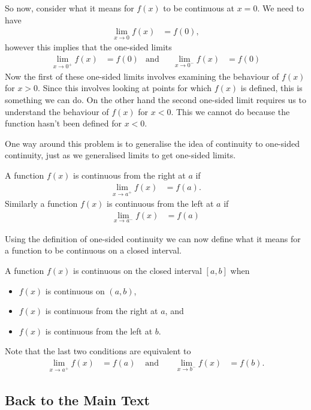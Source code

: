 So now, consider what it means for $f(x)$ to be continuous at $x=0$. We need to have
\begin{align*}
  \lim_{x\to 0} f(x) &= f(0),
\end{align*}
however this implies that the one-sided limits
\begin{align*}
  \lim_{x\to 0^+} f(x) &= f(0) & \text{and}&& \lim_{x\to 0^-} f(x) &= f(0)
\end{align*}
Now the first of these one-sided limits involves examining the behaviour of $f(x)$ for
$x>0$. Since this involves looking at points for which $f(x)$ is defined, this is
something we can do. On the other hand the second one-sided limit requires us to
understand the behaviour of $f(x)$ for $x<0$. This we cannot do because the function
hasn't been defined for $x<0$.

One way around this problem is to generalise the idea of continuity to one-sided
continuity, just as we generalised limits to get one-sided limits.
\begin{defn}\label{def_1_6_2}
  A function $f(x)$ is continuous from the right at $a$ if
  \begin{align*}
    \lim_{x\to a^+} f(x) &= f(a).
  \end{align*}
  Similarly a function $f(x)$ is continuous from the left at $a$ if
  \begin{align*}
    \lim_{x\to a^-} f(x) &= f(a)
  \end{align*}
\end{defn}

Using the definition of one-sided continuity we can now define what it means for a
function to be continuous on a closed interval.
\begin{defn}\label{def_1_6_3}
 A function $f(x)$ is continuous on the closed interval $[a,b]$ when
\begin{itemize}
 \item $f(x)$ is continuous on $(a,b)$,
 \item $f(x)$ is continuous from the right at $a$, and
 \item $f(x)$ is continuous from the left at $b$.
\end{itemize}
Note that the last two conditions are equivalent to
\begin{align*}
   \lim_{x\to a^+} f(x) &= f(a) & \text{ and }&&
  \lim_{x\to b^-} f(x) &= f(b).
\end{align*}
\end{defn}

\subsection*{Back to the Main Text}


